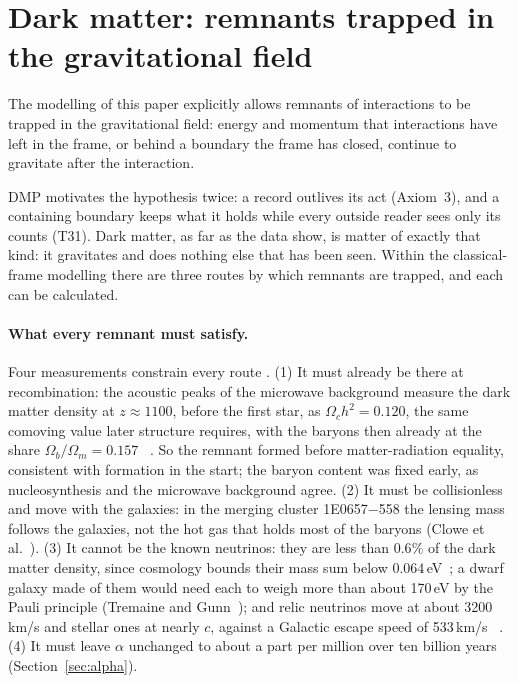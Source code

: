 \section{Dark matter: remnants trapped in the gravitational field}\label{sec:darkmatter}

\begin{hypothesis}\label{h:remnant}
The modelling of this paper explicitly allows remnants of interactions to be trapped in the gravitational field: energy and momentum that
interactions have left in the frame, or behind a boundary the frame has closed, continue to gravitate after the interaction.
\tagH
\end{hypothesis}

DMP motivates the hypothesis twice: a record outlives its act (Axiom~3), and a containing boundary keeps what it holds while every outside
reader sees only its counts (T31). Dark matter, as far as the data show, is matter of exactly that kind: it gravitates and does nothing
else that has been seen. Within the classical-frame modelling there are three routes by which remnants are trapped, and each can be
calculated.

\paragraph{What every remnant must satisfy.} Four measurements constrain every route \tagP. (1) It must already be there at recombination:
the acoustic peaks of the microwave background measure the dark matter density at $z\approx1100$, before the first star, as
$\Omega_ch^2=0.120$, the same comoving value later structure requires, with the baryons then already at the share
$\Omega_b/\Omega_m=0.157$~\cite{planck18} . So the remnant formed before matter-radiation equality, consistent with formation in the start; the baryon content was fixed early, as nucleosynthesis and the microwave background agree. (2) It must be collisionless and move with the galaxies: in the
merging cluster 1E0657$-$558 the lensing mass follows the galaxies, not the hot gas that holds most of the baryons (Clowe et
al.~\cite{clowe}). (3) It cannot be the known neutrinos: they are less than $0.6\%$ of the dark matter density, since cosmology bounds
their mass sum below $0.064$\,eV~\cite{desi2}; a dwarf galaxy made of them would need each to weigh more than about 170\,eV by the Pauli
principle (Tremaine and Gunn~\cite{tremainegunn}); and relic neutrinos move at about 3200\,km/s and stellar ones at nearly $c$, against a
Galactic escape speed of 533\,km/s~\cite{piffl} . (4) It must leave $\alpha$ unchanged to about a part per million over ten
billion years (Section~\ref{sec:alpha}).


